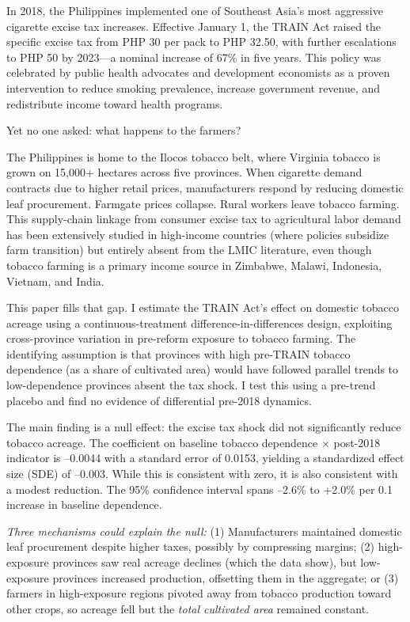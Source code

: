 \documentclass[12pt]{article}
\begin{document}
In 2018, the Philippines implemented one of Southeast Asia's most aggressive cigarette excise tax increases. Effective January 1, the TRAIN Act raised the specific excise tax from PHP 30 per pack to PHP 32.50, with further escalations to PHP 50 by 2023---a nominal increase of 67\% in five years. This policy was celebrated by public health advocates and development economists as a proven intervention to reduce smoking prevalence, increase government revenue, and redistribute income toward health programs.

Yet no one asked: what happens to the farmers?

The Philippines is home to the Ilocos tobacco belt, where Virginia tobacco is grown on 15,000+ hectares across five provinces. When cigarette demand contracts due to higher retail prices, manufacturers respond by reducing domestic leaf procurement. Farmgate prices collapse. Rural workers leave tobacco farming. This supply-chain linkage from consumer excise tax to agricultural labor demand has been extensively studied in high-income countries (where policies subsidize farm transition) but entirely absent from the LMIC literature, even though tobacco farming is a primary income source in Zimbabwe, Malawi, Indonesia, Vietnam, and India.

This paper fills that gap. I estimate the TRAIN Act's effect on domestic tobacco acreage using a continuous-treatment difference-in-differences design, exploiting cross-province variation in pre-reform exposure to tobacco farming. The identifying assumption is that provinces with high pre-TRAIN tobacco dependence (as a share of cultivated area) would have followed parallel trends to low-dependence provinces absent the tax shock. I test this using a pre-trend placebo and find no evidence of differential pre-2018 dynamics.

The main finding is a null effect: the excise tax shock did not significantly reduce tobacco acreage. The coefficient on baseline tobacco dependence $\times$ post-2018 indicator is --0.0044 with a standard error of 0.0153, yielding a standardized effect size (SDE) of --0.003. While this is consistent with zero, it is also consistent with a modest reduction. The 95\% confidence interval spans --2.6\% to +2.0\% per 0.1 increase in baseline dependence.

\emph{Three mechanisms could explain the null:} (1) Manufacturers maintained domestic leaf procurement despite higher taxes, possibly by compressing margins; (2) high-exposure provinces saw real acreage declines (which the data show), but low-exposure provinces increased production, offsetting them in the aggregate; or (3) farmers in high-exposure regions pivoted away from tobacco production toward other crops, so acreage fell but the \emph{total cultivated area} remained constant.
\end{document}

